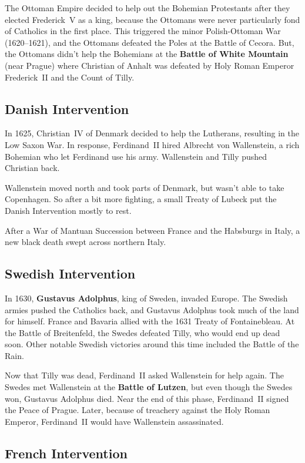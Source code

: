 The Ottoman Empire decided to help out the Bohemian Protestants after they elected Frederick~V as a king,
because the Ottomans were never particularly fond of Catholics in the first place.
This triggered the minor Polish-Ottoman War (1620--1621),
and the Ottomans defeated the Poles at the Battle of Cecora.
But, the Ottomans didn't help the Bohemians at the \textbf{Battle of White Mountain} (near Prague)
where Christian of Anhalt was defeated by Holy Roman Emperor Frederick~II and the Count of Tilly.

\subsection*{Danish Intervention}

In 1625, Christian~IV of Denmark decided to help the Lutherans, resulting in the Low Saxon War.
In response, Ferdinand~II hired Albrecht von Wallenstein, a rich Bohemian who let Ferdinand use his army.
Wallenstein and Tilly pushed Christian back.

Wallenstein moved north and took parts of Denmark, but wasn't able to take Copenhagen.
So after a bit more fighting, a small Treaty of Lubeck put the Danish Intervention mostly to rest.

After a War of Mantuan Succession between France and the Habsburgs in Italy,
a new black death swept across northern Italy.

\subsection*{Swedish Intervention}

In 1630, \textbf{Gustavus Adolphus}, king of Sweden, invaded Europe.
The Swedish armies pushed the Catholics back, and Gustavus Adolphus took much of the land for himself.
France and Bavaria allied with the 1631 Treaty of Fontainebleau.
At the Battle of Breitenfeld, the Swedes defeated Tilly, who would end up dead soon.
Other notable Swedish victories around this time included the Battle of the Rain.

Now that Tilly was dead, Ferdinand~II asked Wallenstein for help again.
The Swedes met Wallenstein at the \textbf{Battle of Lutzen}, but even though the Swedes won, Gustavus Adolphus died.
Near the end of this phase, Ferdinand~II signed the Peace of Prague.
Later, because of treachery against the Holy Roman Emperor, Ferdinand~II would have Wallenstein assassinated.

\subsection*{French Intervention}


